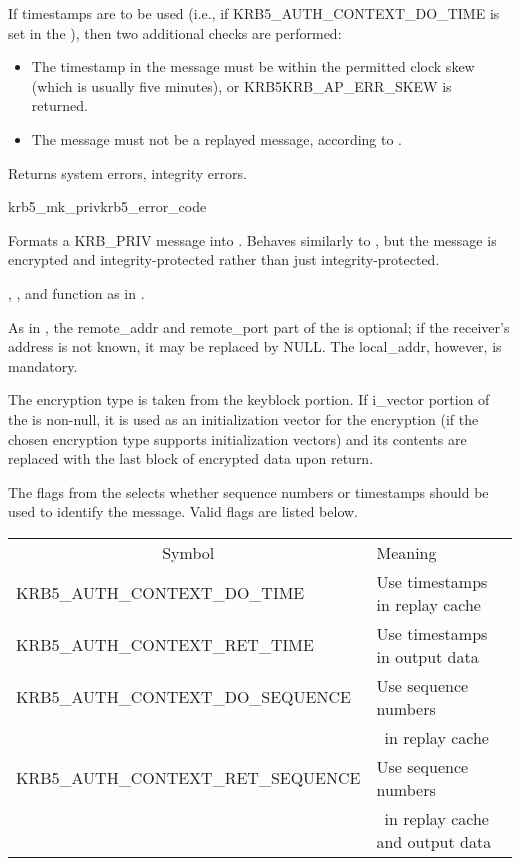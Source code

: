 If timestamps are to be used (i.e., if KRB5_AUTH_CONTEXT_DO_TIME is set
in the ), then two additional checks are performed:
\begin{itemize}
\item The timestamp in the message must be within the permitted clock
        skew (which is usually five minutes), or KRB5KRB_AP_ERR_SKEW
        is returned.
\item The message must not be a replayed message, according to
        .
\end{itemize}

Returns system errors, integrity errors.

\begin{funcdecl}{krb5_mk_priv}{krb5_error_code}{\funcinout}
\funcin
{}
\funcout
{}
\end{funcdecl}

Formats a KRB_PRIV message into .  Behaves similarly
to , but the message is encrypted and
integrity-protected rather than just integrity-protected.

, , 
 and
 function as in .

As in , the remote_addr and remote_port part of
the  is optional; if the receiver's address is
not known, it may be replaced by NULL.  The local_addr, however, is
mandatory.

The encryption type is taken from the  keyblock
portion. If i_vector portion of the 
is non-null, it is used as an initialization vector for the encryption
(if the chosen encryption type supports initialization vectors)
and its contents are replaced with the last block of encrypted data
upon return.

The flags from the  selects whether sequence numbers or timestamps
should be used to identify the message.  Valid flags are listed below.

\begin{tabular}{ll}
\multicolumn{1}{c}{Symbol} & Meaning \\
KRB5_AUTH_CONTEXT_DO_TIME& Use timestamps in replay cache\\
KRB5_AUTH_CONTEXT_RET_TIME& Use timestamps in output data\\
KRB5_AUTH_CONTEXT_DO_SEQUENCE& Use sequence numbers\\
        &\ in replay cache\\
KRB5_AUTH_CONTEXT_RET_SEQUENCE& Use sequence numbers\\
        &\ in replay cache and output data \\
\end{tabular}

